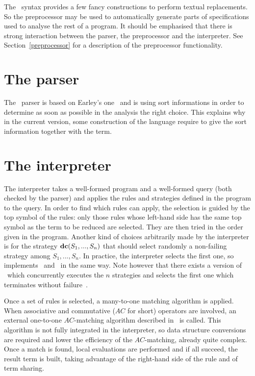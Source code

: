 The \elan\ syntax provides a few fancy constructions to perform
textual replacements. So the preprocessor may be used to automatically
generate parts of specifications used to analyse the rest of a
program.  It should be emphasised that there is strong interaction
between the parser, the preprocessor and the interpreter. 
See Section~\ref{preprocessor} for a description of the preprocessor
functionality. 


\section{The parser}

The \elan\ parser is based on Earley's one~\cite{Earley} and is using sort
informations in order to determine as soon as possible in the analysis
the right choice. This explains why in the current version, some
construction of the language
require to give the sort information together with the term.

\section{The interpreter}


The interpreter takes a well-formed program and a well-formed query
(both checked by the parser) and applies the rules and strategies
defined in the program to the query. In order to find which rules can
apply, the selection is guided by the top symbol of the rules: only
those rules whose left-hand side has the same top symbol as the term
to be reduced are selected. They are then tried in the order given in
the program.  Another kind of choices arbitrarily made by the
interpreter is for the strategy $\textbf{dc}(S_1,...,S_n)$ that should select
randomly a non-failing strategy among $S_1,...,S_n$. In practice, the
interpreter selects the first one, so implements \dc\ and \first\ in the
same way. Note however that there exists a  version of
\elan\ which concurrently executes the $n$ strategies and selects the
first one which terminates without failure~\cite{BorovanskyCastro-WRLA98}.

Once a set of rules is selected, a many-to-one matching algorithm 
is applied. When associative and
commutative  ($AC$ for short) operators are involved, an external 
one-to-one $AC$-matching algorithm described in~\cite{Eker-AcMatch-95}
is called. 
This algorithm is not fully integrated in the interpreter, so 
data structure conversions are required and lower the efficiency of
the $AC$-matching, already  quite complex.
Once a match is found, local evaluations are performed and if all 
succeed, the result term is built, taking advantage of the right-hand 
side of the rule and of term sharing.


